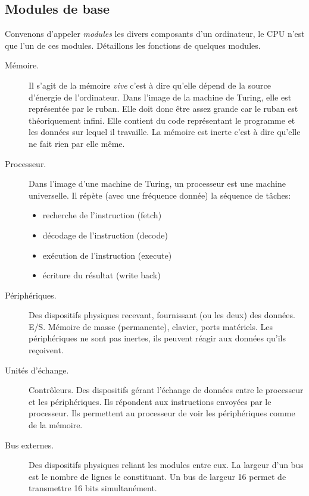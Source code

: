 \subsection{Modules de base}
Convenons d'appeler \emph{modules} les divers composants d'un ordinateur, le CPU n'est que l'un de ces modules. Détaillons les fonctions de quelques modules.
\begin{description}
 \item[Mémoire.] Il s'agit de la mémoire \emph{vive} c'est à dire qu'elle dépend de la source d'énergie de l'ordinateur. Dans l'image de la machine de Turing, elle est représentée par le ruban. Elle doit donc être assez grande car le ruban est théoriquement infini. Elle contient du code représentant le programme et les données sur lequel il travaille. La mémoire est inerte c'est à dire qu'elle ne fait rien par elle même.
\item[Processeur.] Dans l'image d'une machine de Turing, un processeur est une machine universelle. Il répète (avec une fréquence donnée) la séquence de tâches:
 \begin{itemize}
  \item recherche de l'instruction (fetch)
  \item décodage de l'instruction (decode)
  \item exécution de l'instruction (execute)
  \item écriture du résultat (write back)
 \end{itemize}
 \item[Périphériques.] Des dispositifs physiques recevant, fournissant (ou les deux) des données. E/S. Mémoire de masse (permanente), clavier, ports matériels. Les périphériques ne sont pas inertes, ils peuvent réagir aux données qu'ils reçoivent. 
 
 \item[Unités d'échange.]Contrôleurs. Des dispositifs gérant l'échange de données entre le processeur et les périphériques. Ils répondent aux instructions envoyées par le processeur. Ils permettent au processeur de voir les périphériques comme de la mémoire.
 
 \item[Bus externes.] Des dispositifs physiques reliant les modules entre eux. La largeur d'un bus est le nombre de lignes le constituant. Un bus de largeur 16 permet de transmettre 16 bits simultanément.
\end{description}
 
